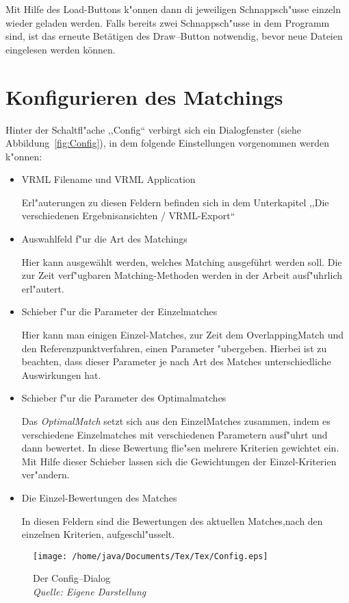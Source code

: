 Mit Hilfe des Load-Buttons k"onnen dann di jeweiligen Schnappsch"usse einzeln wieder geladen werden. Falls bereits zwei Schnappsch"usse in dem Programm sind, ist das erneute Betätigen des Draw--Button notwendig, bevor neue Dateien eingelesen werden können.

\section{Konfigurieren des Matchings}
Hinter der Schaltfl"ache ,,Config`` verbirgt sich ein Dialogfenster (siehe Abbildung~\vref{fig:Config}), in dem folgende Einstellungen vorgenommen werden k"onnen:

\begin{itemize}
\item VRML Filename und VRML Application

Erl"auterungen zu diesen Feldern befinden sich in dem Unterkapitel ,,Die verschiedenen Ergebnisansichten / VRML-Export``

\item Auswahlfeld f"ur die Art des Matchings

Hier kann ausgewählt werden, welches Matching  ausgeführt werden soll. Die zur Zeit verf"ugbaren Matching-Methoden werden in der Arbeit ausf"uhrlich erl"autert.

\item Schieber f"ur die Parameter der Einzelmatches

Hier kann man einigen Einzel-Matches, zur Zeit dem OverlappingMatch und den Referenzpunktverfahren, einen Parameter "ubergeben. Hierbei ist zu beachten, dass dieser Parameter je nach Art des Matches unterschiedliche Auswirkungen hat.

\item Schieber f"ur die Parameter des Optimalmatches

Das \textit{OptimalMatch} setzt sich aus den EinzelMatches zusammen, indem es verschiedene Einzelmatches mit verschiedenen Parametern ausf"uhrt und dann bewertet. In diese Bewertung flie"sen mehrere Kriterien gewichtet ein. Mit Hilfe dieser Schieber lassen sich die Gewichtungen der Einzel-Kriterien ver"andern.

\item Die Einzel-Bewertungen des Matches

In diesen Feldern sind die Bewertungen des aktuellen Matches,nach den einzelnen Kriterien, aufgeschl"usselt.
\end{itemize} 
\begin{figure}
   \centering
   \texttt{[image: /home/java/Documents/Tex/Tex/Config.eps]}
   \caption[Config--Dialog]{Der Config--Dialog\\\textit{Quelle: Eigene Darstellung}}
   \label{fig:Config}
\end{figure}
